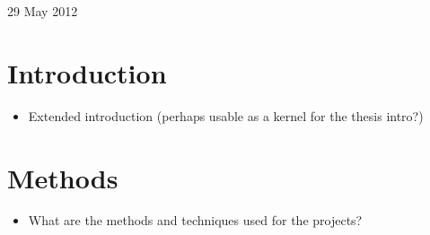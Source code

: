 \documentclass[useAMS,usenatbib,onecolumn]{mn2e}
\begin{document}
\begin{center}
29 May 2012
\end{center}
\newpage

\date{Date of the review}

\section{Introduction}
\label{sec:introduction}

\begin{itemize}
	\item{Extended introduction (perhaps usable as a kernel for the thesis intro?)}
\end{itemize}

\section{Methods}
\label{sec:methods}

\begin{itemize}
	\item{What are the methods and techniques used for the projects?}
\end{itemize}

\end{document}
